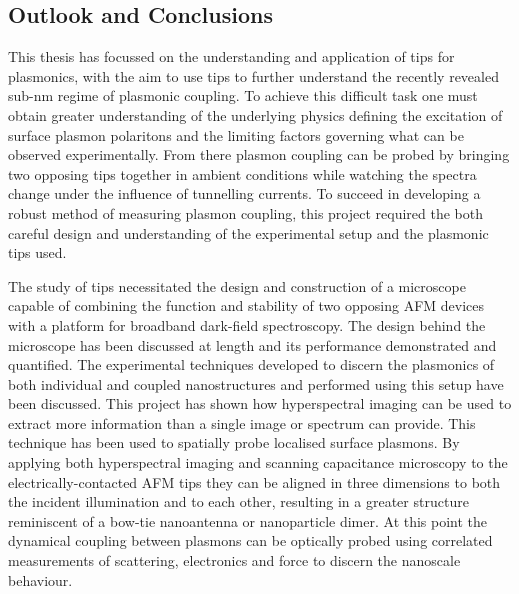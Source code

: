 \documentclass[12pt, a4paper, twoside]{book}
\begin{document}
\begin{singlespace}
\chapter{Outlook and Conclusions}
\end{singlespace}


This thesis has focussed on the understanding and application of tips for plasmonics, with the aim to use tips to further understand the recently revealed sub-nm regime of plasmonic coupling. To achieve this difficult task one must obtain greater understanding of the underlying physics defining the excitation of surface plasmon polaritons and the limiting factors governing what can be observed experimentally. From there plasmon coupling can be probed by bringing two opposing tips together {\color{red}in ambient conditions} while watching the spectra change under the influence of tunnelling currents. To succeed in developing a robust method of measuring plasmon coupling, this project required the both careful design and understanding of the experimental setup and the plasmonic tips used.

The study of tips necessitated the design and construction of a microscope capable of combining the function and stability of two opposing AFM devices with a platform for broadband dark-field spectroscopy. The design behind the microscope has been discussed at length and its performance demonstrated and quantified.
The experimental techniques developed to discern the plasmonics of both individual and coupled nanostructures and performed using this setup have been discussed.  This project has shown how hyperspectral imaging can be used to extract more information than a single image or spectrum can provide. This technique has been used to spatially probe localised surface plasmons.
By applying both hyperspectral imaging and scanning capacitance microscopy to the electrically-contacted AFM tips they can be aligned in three dimensions to both the incident illumination and to each other, resulting in a greater structure reminiscent of a bow-tie nanoantenna or nanoparticle dimer. At this point the dynamical coupling between plasmons can be optically probed using correlated measurements of scattering, electronics and force to discern the nanoscale behaviour.
\end{document}
